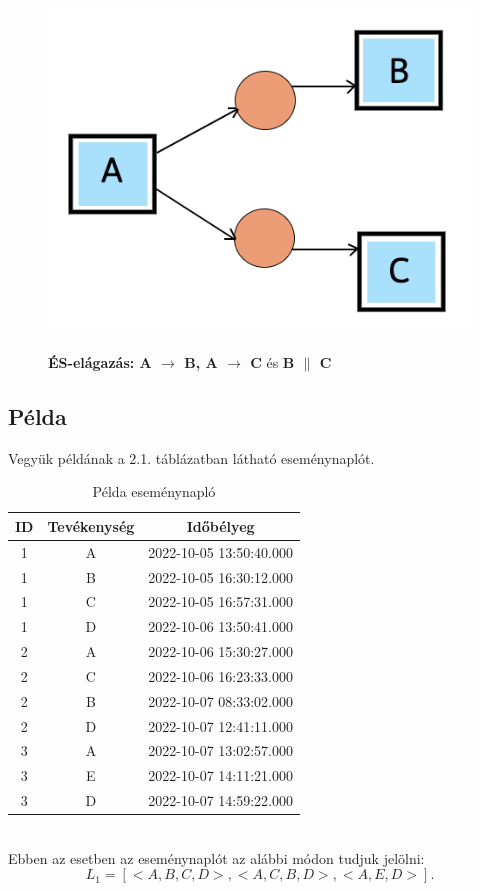 \begin{figure}[h!]
\begin{center}
\includegraphics[width=8truecm, height=6truecm]{images/img_alpha_and}\\
\caption{\textbf{ÉS-elágazás: A $\rightarrow$ B, A $\rightarrow$ C} és \textbf{B $\parallel$ C}}
\label{fig:example}
\end{center}
\end{figure}

\newpage

\subsection{Példa}
Vegyük példának a 2.1. táblázatban látható eseménynaplót.\\
\begin{table}[h]
\begin{center}
\caption{Példa eseménynapló}
\begin{tabular}{||c | c | c ||}
	\hline
	ID & Tevékenység & Időbélyeg \\ [0.5ex]
	\hline\hline
	1 & A & 2022-10-05 13:50:40.000 \\
	\hline
	1 & B & 2022-10-05 16:30:12.000 \\
	\hline
	1 & C & 2022-10-05 16:57:31.000 \\
	\hline
	1 & D & 2022-10-06 13:50:41.000 \\
	\hline
	2 & A & 2022-10-06 15:30:27.000 \\
	\hline
	2 & C & 2022-10-06 16:23:33.000 \\
	\hline
	2 & B & 2022-10-07 08:33:02.000 \\
	\hline
	2 & D & 2022-10-07 12:41:11.000 \\
	\hline
	3 & A & 2022-10-07 13:02:57.000 \\
	\hline
	3 & E & 2022-10-07 14:11:21.000 \\
	\hline
	3 & D & 2022-10-07 14:59:22.000 \\
	\hline
\end{tabular}
\label{fig:example}
\end{center}
\end{table}\\	
Ebben az esetben az eseménynaplót az alábbi módon tudjuk jelölni:
\[ 
	L_1 = [< A,B,C,D >, <A,C,B,D>, <A,E,D>].
\]

